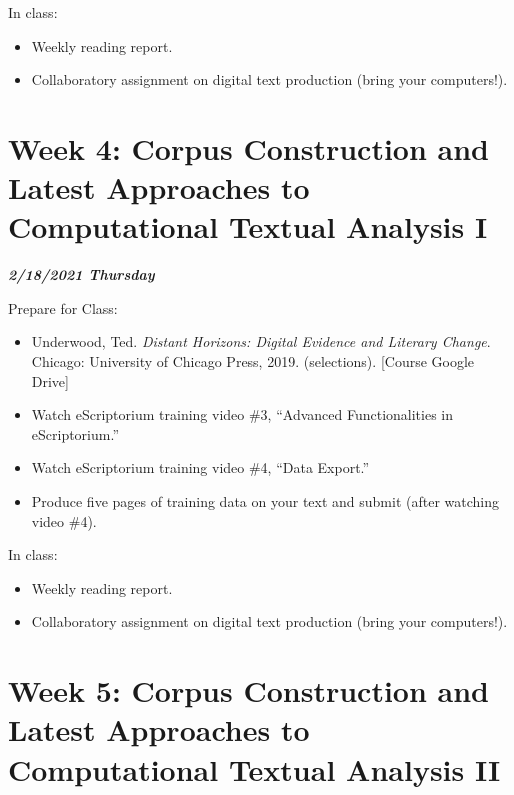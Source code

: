 \documentclass[
]{book}
\providecommand{\tightlist}{%
  \setlength{\itemsep}{0pt}\setlength{\parskip}{0pt}}
\begin{document}
In class:

\begin{itemize}
\tightlist
\item
  Weekly reading report.
\item
  Collaboratory assignment on digital text production (bring your computers!).
\end{itemize}

\hypertarget{week-4-corpus-construction-and-latest-approaches-to-computational-textual-analysis-i-1}{%
\chapter{Week 4: Corpus Construction and Latest Approaches to Computational Textual Analysis I}\label{week-4-corpus-construction-and-latest-approaches-to-computational-textual-analysis-i-1}}

\textbf{\emph{2/18/2021 Thursday}}

Prepare for Class:

\begin{itemize}
\tightlist
\item
  Underwood, Ted. \emph{Distant Horizons: Digital Evidence and Literary Change}. Chicago: University of Chicago Press, 2019. (selections). {[}Course Google Drive{]}
\item
  Watch eScriptorium training video \#3, ``Advanced Functionalities in eScriptorium.''
\item
  Watch eScriptorium training video \#4, ``Data Export.''
\item
  Produce five pages of training data on your text and submit (after watching video \#4).
\end{itemize}

In class:

\begin{itemize}
\tightlist
\item
  Weekly reading report.
\item
  Collaboratory assignment on digital text production (bring your computers!).
\end{itemize}

\hypertarget{week-5-corpus-construction-and-latest-approaches-to-computational-textual-analysis-ii-1}{%
\chapter{Week 5: Corpus Construction and Latest Approaches to Computational Textual Analysis II}\label{week-5-corpus-construction-and-latest-approaches-to-computational-textual-analysis-ii-1}}
\end{document}
